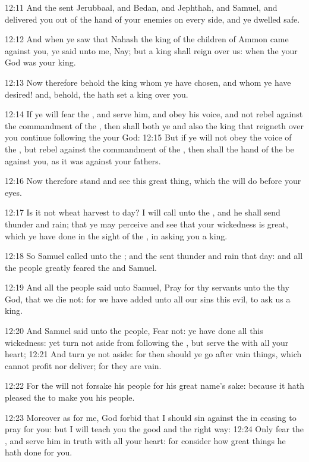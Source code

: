 12:11 And the \LORD sent Jerubbaal, and Bedan, and Jephthah, and Samuel, and delivered you out of the hand of your enemies on every side, and ye dwelled safe.

12:12 And when ye saw that Nahash the king of the children of Ammon came against you, ye said unto me, Nay; but a king shall reign over us: when the \LORD your God was your king.

12:13 Now therefore behold the king whom ye have chosen, and whom ye have desired! and, behold, the \LORD hath set a king over you.

12:14 If ye will fear the \LORD, and serve him, and obey his voice, and not rebel against the commandment of the \LORD, then shall both ye and also the king that reigneth over you continue following the \LORD your God: 12:15 But if ye will not obey the voice of the \LORD, but rebel against the commandment of the \LORD, then shall the hand of the \LORD be against you, as it was against your fathers.

12:16 Now therefore stand and see this great thing, which the \LORD will do before your eyes.

12:17 Is it not wheat harvest to day? I will call unto the \LORD, and he shall send thunder and rain; that ye may perceive and see that your wickedness is great, which ye have done in the sight of the \LORD, in asking you a king.

12:18 So Samuel called unto the \LORD; and the \LORD sent thunder and rain that day: and all the people greatly feared the \LORD and Samuel.

12:19 And all the people said unto Samuel, Pray for thy servants unto the \LORD thy God, that we die not: for we have added unto all our sins this evil, to ask us a king.

12:20 And Samuel said unto the people, Fear not: ye have done all this wickedness: yet turn not aside from following the \LORD, but serve the \LORD with all your heart; 12:21 And turn ye not aside: for then should ye go after vain things, which cannot profit nor deliver; for they are vain.

12:22 For the \LORD will not forsake his people for his great name's sake: because it hath pleased the \LORD to make you his people.

12:23 Moreover as for me, God forbid that I should sin against the \LORD in ceasing to pray for you: but I will teach you the good and the right way: 12:24 Only fear the \LORD, and serve him in truth with all your heart: for consider how great things he hath done for you.

